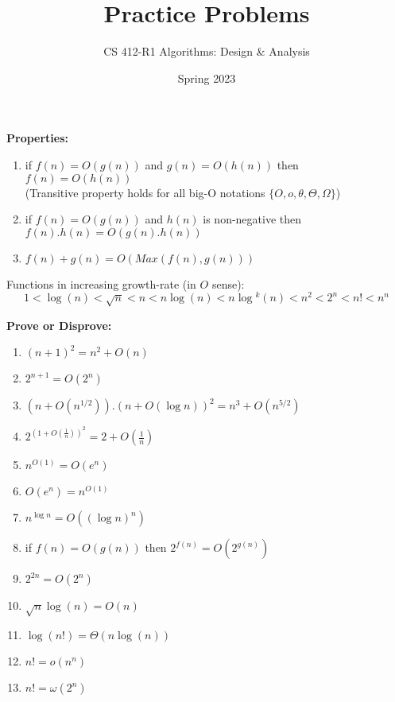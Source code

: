 \documentclass{article}
\title{Practice Problems}
\author{CS 412-R1 Algorithms: Design \& Analysis}
\date{Spring 2023}
\begin{document}
\maketitle

\noindent \textbf{Properties:}
\begin{enumerate}
    \item if $f(n)=O(g(n))$ and $g(n)=O(h(n))$ then $f(n)=O(h(n))$ \\(Transitive property holds for all big-O notations $\{O,o,\theta,\Theta, \Omega\}$)
    \item if $f(n)=O(g(n))$ and $h(n)$ is non-negative then $f(n).h(n)=O(g(n).h(n))$
    \item $f(n)+g(n)=O(Max(f(n),g(n)))$
\end{enumerate}

Functions in increasing growth-rate (in $O$ sense):
$$1<\log{(n)}< \sqrt{n}< n< n\log{(n)}< n\log{^k(n)}< n^2< 2^n< n!< n^n$$

\noindent \textbf{Prove or Disprove:}
\begin{enumerate}
    \item $(n+1)^2=n^2+O(n)$
    \item $2^{n+1}=O(2^n)$
    \item $(n+O(n^{1/2})).(n+O(\log n))^2=n^3+O(n^{5/2})$
    \item $2^{(1+O(\frac{1}{n}))^2}=2+O(\frac{1}{n})$
    \item $n^{O(1)}=O(e^n)$
    \item $O(e^n)=n^{O(1)}$
    \item $n^{\log n}=O((\log n)^n)$
    \item if $f(n)=O(g(n))$ then $2^{f(n)}=O(2^{g(n)})$
    \item $2^{2n}=O(2^n)$
    \item $\sqrt{n}\log{(n)} = O(n)$
    \item $\log{(n!)} = \Theta (n \log{(n)})$
    \item $n! = o(n^n)$
    \item $n! = \omega(2^n)$
\end{enumerate}
\end{document}
